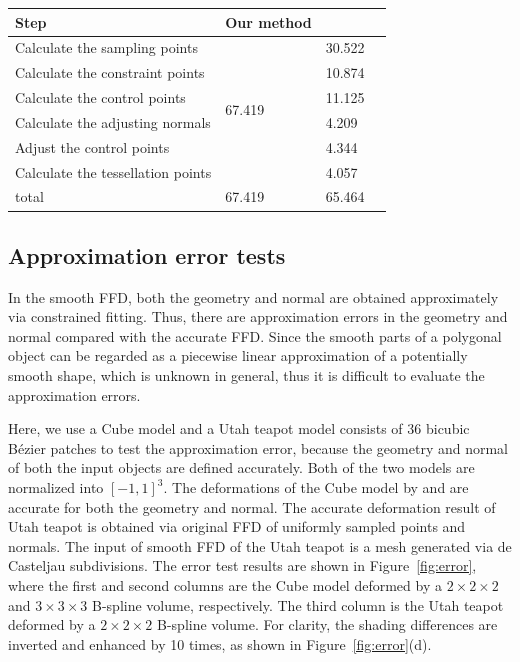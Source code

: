 \documentclass[3p]{elsarticle}
\makeatletter
\newcommand\tabcaption{\def\@captype{table}\caption}
\makeatother
\begin{document}
\begin{minipage}[c]{0.7\textwidth} 
  \centering
  \footnotesize
    \tabcaption{Comparison of the efficiencies of our method and \cite{Cui15}(deform stage)}
  \begin{tabular}{llll}
  	\hline
  	Step & Our method & \cite{Cui15}\\
  	\hline
      Calculate the sampling points     & \multirow{6}{*}{67.419} & 30.522     \\
  	Calculate the constraint points   &   & 10.874     \\
  	Calculate the control points      &   & 11.125     \\
  	Calculate the adjusting normals   &   & 4.209     \\
  	Adjust the control points         &   & 4.344     \\
  	Calculate the tessellation points &   & 4.057     \\
  	\hline
  	total                             & 67.419  & 65.464    \\
  	\hline
  \end{tabular}
  \label{tab:compare_deform}
\end{minipage} 

\subsection{Approximation error tests}
In the smooth FFD, both the geometry and normal are obtained approximately via constrained fitting. Thus, there
are approximation errors in the geometry and normal compared with the accurate FFD. Since the smooth parts of a
polygonal object can be regarded as a piecewise linear approximation of a potentially smooth shape, which is unknown in
general, thus it is difficult to evaluate the approximation errors.

Here, we use a Cube model and a Utah teapot model consists of 36 bicubic B\'ezier patches to test the approximation
error, because the geometry and normal of both the input objects are defined accurately. Both of the two models are
normalized into $[-1,1]^3$. The deformations of the Cube model by \cite{Cui13} and \cite{Cui14} are accurate for both
the geometry and normal. The accurate deformation result of Utah teapot is obtained via original FFD of uniformly
sampled points and normals. The input of smooth FFD of the Utah teapot is a mesh generated via de Casteljau
subdivisions. The error test results are shown in Figure~\ref{fig:error}, where the first and second columns are the
Cube model deformed by a $2\times2\times2$ and $3\times3\times3$ B-spline volume, respectively. The third column is the
Utah teapot deformed by a $2\times2\times2$ B-spline volume. For clarity, the shading differences are inverted and
enhanced by 10 times, as shown in Figure~\ref{fig:error}(d).
\end{document}
